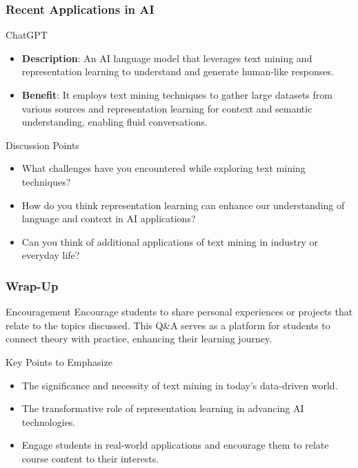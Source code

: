 \documentclass[aspectratio=169]{beamer}
\begin{document}
\begin{frame}[fragile]
    \frametitle{Recent Applications in AI}
    \begin{block}{ChatGPT}
        \begin{itemize}
            \item \textbf{Description}: An AI language model that leverages text mining and representation learning to understand and generate human-like responses.
            \item \textbf{Benefit}: It employs text mining techniques to gather large datasets from various sources and representation learning for context and semantic understanding, enabling fluid conversations.
        \end{itemize}
    \end{block}

    \vspace{0.5cm}
    
    \begin{block}{Discussion Points}
        \begin{itemize}
            \item What challenges have you encountered while exploring text mining techniques?
            \item How do you think representation learning can enhance our understanding of language and context in AI applications?
            \item Can you think of additional applications of text mining in industry or everyday life?
        \end{itemize}
    \end{block}
\end{frame}

\begin{frame}[fragile]
    \frametitle{Wrap-Up}
    \begin{block}{Encouragement}
        Encourage students to share personal experiences or projects that relate to the topics discussed. This Q\&A serves as a platform for students to connect theory with practice, enhancing their learning journey.
    \end{block}

    \begin{block}{Key Points to Emphasize}
        \begin{itemize}
            \item The significance and necessity of text mining in today's data-driven world.
            \item The transformative role of representation learning in advancing AI technologies.
            \item Engage students in real-world applications and encourage them to relate course content to their interests.
        \end{itemize}
    \end{block}
\end{frame}
\end{document}
